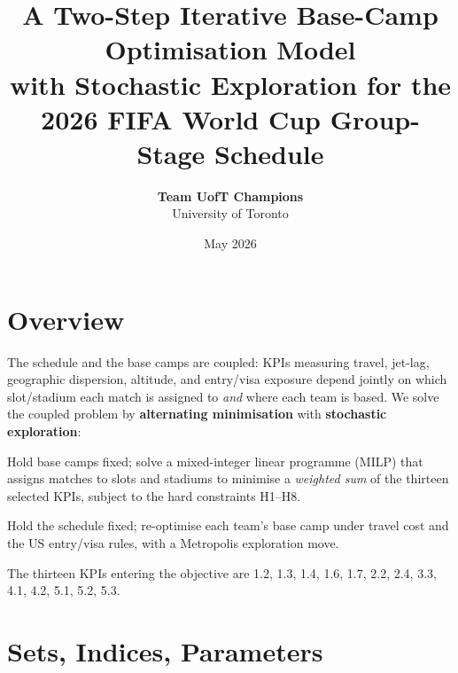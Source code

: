 \documentclass[12pt, letterpaper]{article}
\title{\textbf{A Two-Step Iterative Base-Camp Optimisation Model\\
       with Stochastic Exploration for the 2026 FIFA World Cup
       Group-Stage Schedule}}
\author{\textbf{Team UofT Champions}\\[4pt]\small University of Toronto}
\date{May 2026}
\begin{document}
\maketitle

\section{Overview}

The schedule and the base camps are coupled: KPIs measuring travel,
jet-lag, geographic dispersion, altitude, and entry/visa exposure depend
jointly on which slot/stadium each match is assigned to \emph{and} where
each team is based. We solve the coupled problem by
\textbf{alternating minimisation} with \textbf{stochastic exploration}:

\begin{description}[leftmargin=1.4em, itemsep=3pt]
  \item[\textbf{Step A (Schedule step).}] Hold base camps fixed; solve a
        mixed-integer linear programme (MILP) that assigns matches to
        slots and stadiums to minimise a \emph{weighted sum} of the
        thirteen selected KPIs, subject to the hard constraints H1--H8.
  \item[\textbf{Step B (Base-camp step).}] Hold the schedule fixed;
        re-optimise each team's base camp under travel cost and the US
        entry/visa rules, with a Metropolis exploration move.
\end{description}

The thirteen KPIs entering the objective are
1.2, 1.3, 1.4, 1.6, 1.7, 2.2, 2.4, 3.3, 4.1, 4.2, 5.1, 5.2, 5.3.

\section{Sets, Indices, Parameters}
\end{document}
